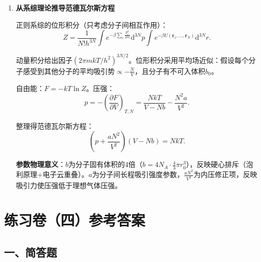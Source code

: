 \documentclass[12pt,a4paper,fontset=mac]{ctexart}
\newcommand{\rr}{\mathbf{r}}
\newcommand{\dd}{\mathrm{d}}
\newcommand{\đ}{\mathrm{đ}}
\begin{document}
\begin{enumerate}
\item \textbf{从系综理论推导范德瓦尔斯方程}

正则系综的位形积分（只考虑分子间相互作用）：
\[Z=\frac{1}{N!h^{3N}}\int e^{-\beta\sum_i\frac{p_i^2}{2m}}\dd^{3N}p\int e^{-\beta U(\rr_1,\ldots,\rr_N)}\dd^{3N}r.\]

动量积分给出因子$(2\pi mkT/h^2)^{3N/2}$。位形积分采用平均场近似：假设每个分子感受到其他分子的平均吸引势$\propto -\frac{N}{V}$，且分子有不可入体积$b_0$。

自由能：$F=-kT\ln Z$。压强：
\[p=-\left(\frac{\partial F}{\partial V}\right)_{T,N}=\frac{NkT}{V-Nb}-\frac{N^2a}{V^2}.\]

整理得范德瓦尔斯方程：
\[\left(p+\frac{aN^2}{V^2}\right)(V-Nb)=NkT.\]

\textbf{参数物理意义}：$b$为分子固有体积的4倍（$b=4N_A\cdot\frac{4}{3}\pi r_0^3$），反映硬心排斥（泡利原理+电子云重叠）。$a$为分子间长程吸引强度参数，$\frac{aN^2}{V^2}$为内压修正项，反映吸引力使压强低于理想气体压强。

\end{enumerate}

\newpage

\section*{练习卷（四）参考答案}

\subsection*{一、简答题}
\end{document}
